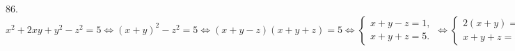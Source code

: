 86. $x^2+2xy+y^2-z^2=5\Leftrightarrow (x+y)^2-z^2=5\Leftrightarrow (x+y-z)(x+y+z)=5\Leftrightarrow \begin{cases} x+y-z=1,\\ x+y+z=5.\end{cases}
\Leftrightarrow \begin{cases} 2(x+y)=6,\\ x+y+z=5.\end{cases}
\Leftrightarrow \begin{cases} x+y=3,\\ z=2.\end{cases}\Rightarrow
(x;y;z)\in \{(1;2;2),(2;1;2)\}.$\\
